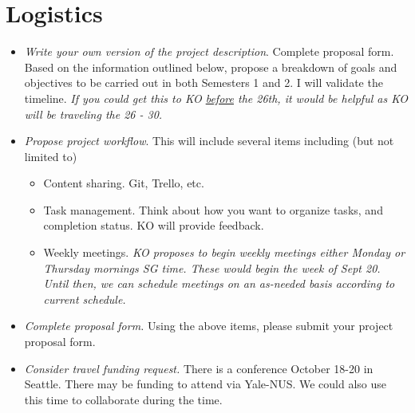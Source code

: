 \documentclass[a4paper,reqno]{article}
\begin{document}
    \section{Logistics}
        \begin{itemize}
            \item \textit{Write your own version of the project description}.  Complete proposal form. Based on the information outlined below, propose a breakdown of goals and objectives to be carried out in both Semesters 1 and 2. I will validate the timeline.  \emph{If you could get this to KO \underline{before} the 26th, it would be helpful as KO will be traveling the 26 - 30.}
            \item \textit{Propose project workflow}.  This will include several items including (but not limited to)
                \begin{itemize}
                    \item Content sharing.  Git, Trello, etc.
                    \item Task management.  Think about how you want to organize tasks, and completion status.  KO will provide feedback.  
                    \item Weekly meetings. \emph{KO proposes to begin weekly meetings either Monday or Thursday mornings SG time.  These would begin the week of Sept 20.  Until then, we can schedule meetings on an as-needed basis according to current schedule.}
                \end{itemize}
            \item \textit{Complete proposal form.} Using the above items, please submit your project proposal form.
            \item \textit{Consider travel funding request.} There is a conference October 18-20 in Seattle.  There may be funding to attend via Yale-NUS.  We could also use this time to collaborate during the time.  
        \end{itemize}
            


\end{document}
